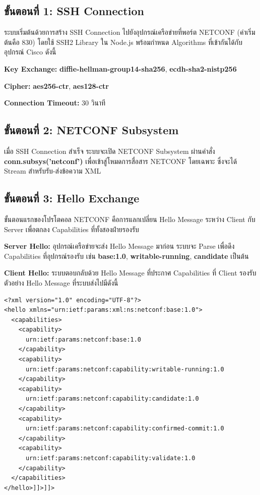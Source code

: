 \subsection{ขั้นตอนที่ 1: SSH Connection}
\hspace*{1.3em}
ระบบเริ่มต้นด้วยการสร้าง SSH Connection ไปยังอุปกรณ์เครือข่ายที่พอร์ต NETCONF (ค่าเริ่มต้นคือ 830) โดยใช้ SSH2 Library ใน Node.js พร้อมกำหนด Algorithms ที่เข้ากันได้กับอุปกรณ์ Cisco ดังนี้

\begin{mycustomenum2}
    \item \textbf{Key Exchange:} \textbf{diffie-hellman-group14-sha256}, \textbf{ecdh-sha2-nistp256}
    \item \textbf{Cipher:} \textbf{aes256-ctr}, \textbf{aes128-ctr}
    \item \textbf{Connection Timeout:} 30 วินาที
\end{mycustomenum2}

\subsection{ขั้นตอนที่ 2: NETCONF Subsystem}
\hspace*{1.3em}
เมื่อ SSH Connection สำเร็จ ระบบจะเปิด NETCONF Subsystem ผ่านคำสั่ง \textbf{conn.subsys('netconf')} เพื่อเข้าสู่โหมดการสื่อสาร NETCONF โดยเฉพาะ ซึ่งจะได้ Stream สำหรับรับ-ส่งข้อความ XML

\subsection{ขั้นตอนที่ 3: Hello Exchange}
\hspace*{1.3em}
ขั้นตอนแรกของโปรโตคอล NETCONF คือการแลกเปลี่ยน Hello Message ระหว่าง Client กับ Server เพื่อตกลง Capabilities ที่ทั้งสองฝ่ายรองรับ

\hspace*{1.3em}
\textbf{Server Hello:} อุปกรณ์เครือข่ายจะส่ง Hello Message มาก่อน ระบบจะ Parse เพื่อดึง Capabilities ที่อุปกรณ์รองรับ เช่น \textbf{base:1.0}, \textbf{writable-running}, \textbf{candidate} เป็นต้น

\hspace*{1.3em}
\textbf{Client Hello:} ระบบตอบกลับด้วย Hello Message ที่ประกาศ Capabilities ที่ Client รองรับ ตัวอย่าง Hello Message ที่ระบบส่งไปมีดังนี้

\begin{verbatim}
<?xml version="1.0" encoding="UTF-8"?>
<hello xmlns="urn:ietf:params:xml:ns:netconf:base:1.0">
  <capabilities>
    <capability>
      urn:ietf:params:netconf:base:1.0
    </capability>
    <capability>
      urn:ietf:params:netconf:capability:writable-running:1.0
    </capability>
    <capability>
      urn:ietf:params:netconf:capability:candidate:1.0
    </capability>
    <capability>
      urn:ietf:params:netconf:capability:confirmed-commit:1.0
    </capability>
    <capability>
      urn:ietf:params:netconf:capability:validate:1.0
    </capability>
  </capabilities>
</hello>]]>]]>
\end{verbatim}

